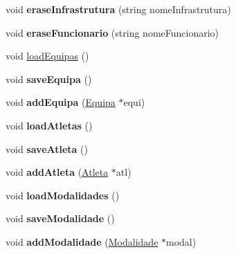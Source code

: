 \begin{DoxyCompactItemize}
\item 
\hypertarget{class_campeonato_ab9c05c50791fc841fa94ee9a5671e9cf}{}void {\bfseries erase\+Infrastrutura} (string nome\+Infrastrutura)\label{class_campeonato_ab9c05c50791fc841fa94ee9a5671e9cf}

\item 
\hypertarget{class_campeonato_abc621f4b26cbda73e700ae2bd757e52b}{}void {\bfseries erase\+Funcionario} (string nome\+Funcionario)\label{class_campeonato_abc621f4b26cbda73e700ae2bd757e52b}

\item 
void \hyperlink{class_campeonato_a9e16c686a4b5388978c9523da2d14393}{load\+Equipas} ()
\item 
\hypertarget{class_campeonato_a5d84a164e4acbd7c1c3eef304677754f}{}void {\bfseries save\+Equipa} ()\label{class_campeonato_a5d84a164e4acbd7c1c3eef304677754f}

\item 
\hypertarget{class_campeonato_a4a436d5b73072a16897b00f6781e749f}{}void {\bfseries add\+Equipa} (\hyperlink{class_equipa}{Equipa} $\ast$equi)\label{class_campeonato_a4a436d5b73072a16897b00f6781e749f}

\item 
\hypertarget{class_campeonato_afa2f81839bea9fa595861d7320210ab5}{}void {\bfseries load\+Atletas} ()\label{class_campeonato_afa2f81839bea9fa595861d7320210ab5}

\item 
\hypertarget{class_campeonato_adbbf4389d5aba7da1ed9b32acf89e6eb}{}void {\bfseries save\+Atleta} ()\label{class_campeonato_adbbf4389d5aba7da1ed9b32acf89e6eb}

\item 
\hypertarget{class_campeonato_a1897e31f57f82f54354e248514627732}{}void {\bfseries add\+Atleta} (\hyperlink{class_atleta}{Atleta} $\ast$atl)\label{class_campeonato_a1897e31f57f82f54354e248514627732}

\item 
\hypertarget{class_campeonato_aef8c4ac585a4fb31f36c79a446ea7e74}{}void {\bfseries load\+Modalidades} ()\label{class_campeonato_aef8c4ac585a4fb31f36c79a446ea7e74}

\item 
\hypertarget{class_campeonato_a9930be88df76b23b869f8b59225c33e6}{}void {\bfseries save\+Modalidade} ()\label{class_campeonato_a9930be88df76b23b869f8b59225c33e6}

\item 
\hypertarget{class_campeonato_ac3b0f8f58de8702ec16c0ad1f019aec2}{}void {\bfseries add\+Modalidade} (\hyperlink{class_modalidade}{Modalidade} $\ast$modal)\label{class_campeonato_ac3b0f8f58de8702ec16c0ad1f019aec2}


\end{DoxyCompactItemize}
